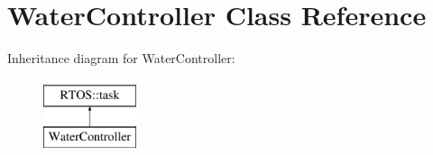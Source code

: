 \hypertarget{class_water_controller}{}\section{Water\+Controller Class Reference}
\label{class_water_controller}
Inheritance diagram for Water\+Controller\+:\begin{figure}[H]
\begin{center}
\leavevmode
\includegraphics[height=2.000000cm]{class_water_controller}
\end{center}
\end{figure}
